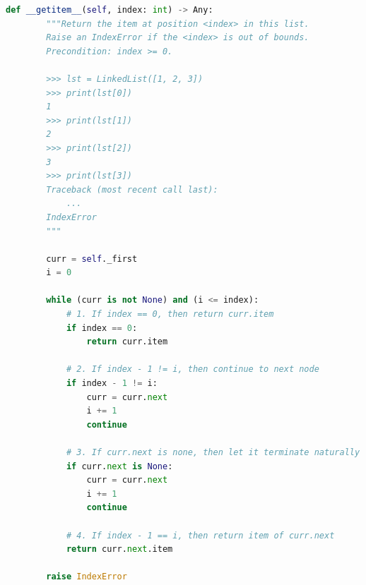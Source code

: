 \documentclass[12pt]{article}
\begin{document}
\newpage

\begin{lstlisting}[language=Python,caption={worksheet\_13\_q2\_solution.py},captionpos=b]
    def __getitem__(self, index: int) -> Any:
        """Return the item at position <index> in this list.
        Raise an IndexError if the <index> is out of bounds.
        Precondition: index >= 0.

        >>> lst = LinkedList([1, 2, 3])
        >>> print(lst[0])
        1
        >>> print(lst[1])
        2
        >>> print(lst[2])
        3
        >>> print(lst[3])
        Traceback (most recent call last):
            ...
        IndexError
        """

        curr = self._first
        i = 0

        while (curr is not None) and (i <= index):
            # 1. If index == 0, then return curr.item
            if index == 0:
                return curr.item

            # 2. If index - 1 != i, then continue to next node
            if index - 1 != i:
                curr = curr.next
                i += 1
                continue

            # 3. If curr.next is none, then let it terminate naturally
            if curr.next is None:
                curr = curr.next
                i += 1
                continue

            # 4. If index - 1 == i, then return item of curr.next
            return curr.next.item

        raise IndexError
\end{lstlisting}
\end{document}
